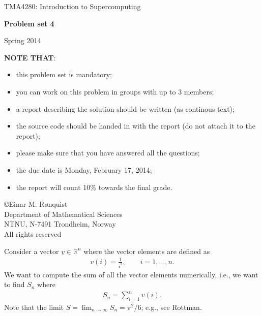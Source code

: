\documentclass[11pt]{article}
\begin{document}
 
\LARGE
\begin{center}
TMA4280: Introduction to Supercomputing
\end{center}
\vspace{1in}

\begin{center}
{\bf Problem set 4}
\end{center}

\Large
\vspace{0.5in}
\begin{center}
Spring 2014
\end{center}

\vspace{0.5in}

{\bf NOTE THAT}:
\begin{itemize}
  \item this problem set is mandatory;
  \item you can work on this problem in groups with up to 3 members;
  \item a report describing the solution should be written (as continous text);
  \item the source code should be handed in with the report (do not attach it to the report);
  \item please make sure that you have answered all the questions; 
  \item the due date is Monday, February 17, 2014;
  \item the report will count 10\% towards the final grade.
\end{itemize}

\vspace{0.5in}

\begin{center}
\copyright Einar M. R{\o}nquist \\
Department of Mathematical Sciences\\
NTNU, N-7491 Trondheim, Norway\\
All rights reserved
\end{center}

\large

\newpage

\noindent 
Consider a vector $\underline{v} \in \mathbb{R}^n$ where the vector elements are defined as
\begin{align}
  v(i) = \frac{1}{i^2}, \qquad i=1,\ldots, n. 
\end{align}
We want to compute the sum of all the vector elements numerically, i.e., 
we want to find $S_n$ where
\begin{align}
  S_n = \sum_{i=1}^n v(i).
\end{align}
Note that the limit $S = \lim_{n\rightarrow\infty} S_n = \pi^2/6$; e.g., see Rottman.
\vspace{1cm}
\end{document}
